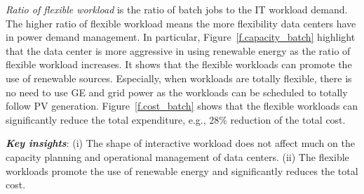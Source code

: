 \emph{Ratio of flexible workload} is the ratio of batch jobs to the IT workload demand. The higher ratio of flexible workload means the more flexibility data centers have in power demand management. In particular, Figure~\ref{f.capacity_batch} highlight that the data center is more aggressive in using renewable energy as the ratio of flexible workload increases. It shows that the flexible workloads can promote the use of renewable sources. Especially, when workloads are totally flexible, there is no need to use GE and grid power as the workloads can be scheduled to totally follow PV generation. Figure~\ref{f.cost_batch} shows that the flexible workloads can significantly reduce the total expenditure, e.g., 28\% reduction of the total cost.

\textbf{\textit{Key insights}}: (i) The shape of interactive workload does not affect much on the capacity planning and operational management of data centers. (ii) The flexible workloads promote the use of renewable energy and significantly reduces the total cost.